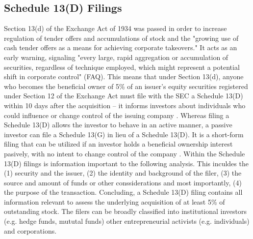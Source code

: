\documentclass[12pt]{article}
\begin{document}
\subsection{Schedule 13(D) Filings}
Section 13(d) of the Exchange Act of 1934 was passed in order to increase regulation of tender offers and accumulations of stock and the "growing use of cash tender offers as a means for achieving corporate takeovers."  
It acts as an early warning, signaling "every large, rapid aggregation or accumulation of securities, regardless of technique employed, which might represent a potential shift in corporate control" (FAQ). 
This means that under Section 13(d), anyone who becomes the beneficial owner of 5\% of an issuer's equity securities registered under Section 12 of the Exchange Act must file with the SEC a Schedule 13(D) within 10 days after the acquisition -- it informs investors about individuals who could influence or change control of the issuing company \citep{Giglia2018}. Whereas filing a Schedule 13(D) allows the investor to behave in an active manner, a passive investor can file a Schedule 13(G) in lieu of a Schedule 13(D). It is a short-form filing that can be utilized if an investor holds a beneficial ownership interest pasively, with no intent to change control of the company \citep{Giglia2018}. Within the Schedule 13(D) filings is information important to the following analysis. This inculdes the (1) security and the issuer, (2) the identity and background of the filer, (3) the source and amount of funds or other conssiderations and most importantly, (4) the purpose of the transaction. Concluding, a Schedule 13(D) filing contains all information relevant to assess the underlying acquisition of at least 5\% of outstanding stock. The filers can be broadly classified into institutional investors (e.g. hedge funds, mututal funds) other entrepreneurial activists (e.g. individuals) \citep{Klein2009} and corporations. 
\end{document}
